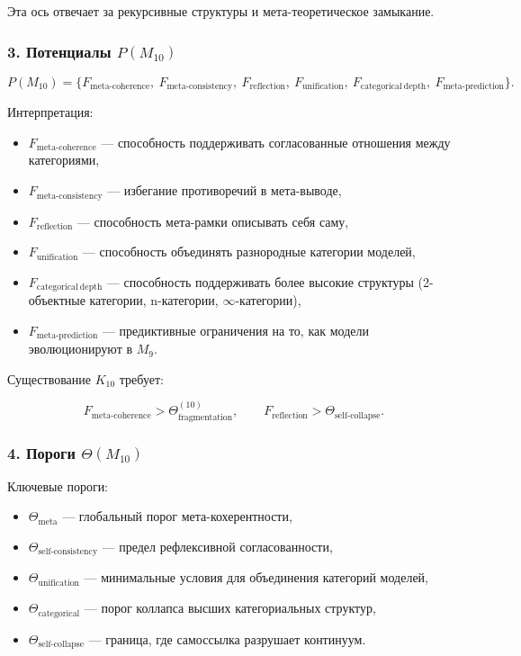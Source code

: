 Эта ось отвечает за рекурсивные структуры и
мета-теоретическое замыкание.

\subsubsection*{3. Потенциалы \texorpdfstring{$P(M_{10})$}{P(M_{10})}}

\[
P(M_{10}) =
\{
F_{\mathrm{meta\mbox{-}coherence}},\
F_{\mathrm{meta\mbox{-}consistency}},\
F_{\mathrm{reflection}},\
F_{\mathrm{unification}},\
F_{\mathrm{categorical\ depth}},\
F_{\mathrm{meta\mbox{-}prediction}}
\}.
\]

Интерпретация:

\begin{itemize}
    \item $F_{\mathrm{meta\mbox{-}coherence}}$ — способность поддерживать
        согласованные отношения между категориями,
    \item $F_{\mathrm{meta\mbox{-}consistency}}$ — избегание
        противоречий в мета-выводе,
    \item $F_{\mathrm{reflection}}$ — способность мета-рамки описывать себя саму,
    \item $F_{\mathrm{unification}}$ — способность объединять разнородные категории моделей,
    \item $F_{\mathrm{categorical\ depth}}$ — способность поддерживать более высокие структуры
        (2-объектные категории, n-категории, $\infty$-категории),
    \item $F_{\mathrm{meta\mbox{-}prediction}}$ — предиктивные ограничения на
        то, как модели эволюционируют в $M_9$.
\end{itemize}

Существование $K_{10}$ требует:

\[
F_{\mathrm{meta\mbox{-}coherence}}>\Theta_{\mathrm{fragmentation}}^{(10)},
\qquad
F_{\mathrm{reflection}}>\Theta_{\mathrm{self\mbox{-}collapse}}.
\]

\subsubsection*{4. Пороги \texorpdfstring{$\Theta(M_{10})$}{\Theta(M_{10})}}

Ключевые пороги:

\begin{itemize}
    \item $\Theta_{\mathrm{meta}}$ — глобальный порог мета-кохерентности,
    \item $\Theta_{\mathrm{self\mbox{-}consistency}}$ — предел рефлексивной согласованности,
    \item $\Theta_{\mathrm{unification}}$ — минимальные условия для объединения категорий моделей,
    \item $\Theta_{\mathrm{categorical}}$ — порог коллапса высших категориальных структур,
    \item $\Theta_{\mathrm{self\mbox{-}collapse}}$ — граница, где самоссылка
        разрушает континуум.
\end{itemize}

